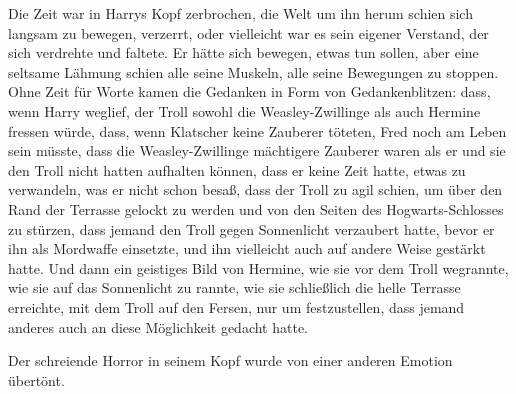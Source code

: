 Die Zeit war in Harrys Kopf zerbrochen, die Welt um ihn herum schien sich langsam zu bewegen, verzerrt, oder vielleicht war es sein eigener Verstand, der sich verdrehte und faltete. Er hätte sich bewegen, etwas tun sollen, aber eine seltsame Lähmung schien alle seine Muskeln, alle seine Bewegungen zu stoppen. Ohne Zeit für Worte kamen die Gedanken in Form von Gedankenblitzen: dass, wenn Harry weglief, der Troll sowohl die Weasley-Zwillinge als auch Hermine fressen würde, dass, wenn Klatscher keine Zauberer töteten, Fred noch am Leben sein müsste, dass die Weasley-Zwillinge mächtigere Zauberer waren als er und sie den Troll nicht hatten aufhalten können, dass er keine Zeit hatte, etwas zu verwandeln, was er nicht schon besaß, dass der Troll zu agil schien, um über den Rand der Terrasse gelockt zu werden und von den Seiten des Hogwarts-Schlosses zu stürzen, dass jemand den Troll gegen Sonnenlicht verzaubert hatte, bevor er ihn als Mordwaffe einsetzte, und ihn vielleicht auch auf andere Weise gestärkt hatte.
Und dann ein geistiges Bild von Hermine, wie sie vor dem Troll wegrannte, wie sie auf das Sonnenlicht zu rannte, wie sie schließlich die helle Terrasse erreichte, mit dem Troll auf den Fersen, nur um festzustellen, dass jemand anderes auch an diese Möglichkeit gedacht hatte.

Der schreiende Horror in seinem Kopf wurde von einer anderen Emotion übertönt.

